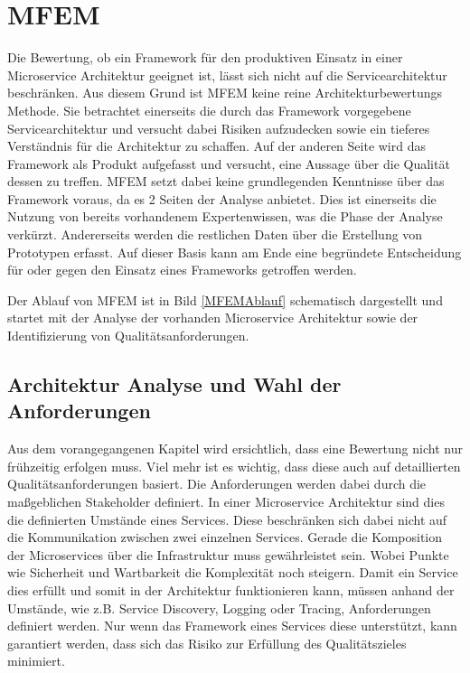 \section{\acf{MFEM}}

Die Bewertung, ob ein Framework für den produktiven Einsatz in einer Microservice Architektur geeignet ist, lässt sich nicht auf die Servicearchitektur beschränken. Aus diesem Grund ist \ac{MFEM} keine reine Architekturbewertungs Methode. Sie betrachtet einerseits die durch das Framework vorgegebene Servicearchitektur und versucht dabei Risiken aufzudecken sowie ein tieferes Verständnis für die Architektur zu schaffen. Auf der anderen Seite wird das Framework als Produkt aufgefasst und versucht, eine Aussage über die Qualität dessen zu treffen. \ac{MFEM} setzt dabei keine grundlegenden Kenntnisse über das Framework voraus, da es 2 Seiten der Analyse anbietet. Dies ist einerseits die Nutzung von bereits vorhandenem Expertenwissen, was die Phase der Analyse verkürzt. Andererseits werden die restlichen Daten über die Erstellung von Prototypen erfasst.
Auf dieser Basis kann am Ende eine begründete Entscheidung für oder gegen den Einsatz eines Frameworks getroffen werden.

Der Ablauf von \ac{MFEM} ist in Bild \ref{MFEMAblauf} schematisch dargestellt und startet mit der Analyse der vorhanden Microservice Architektur sowie der Identifizierung von Qualitätsanforderungen.


\subsection{Architektur Analyse und Wahl der Anforderungen}

Aus dem vorangegangenen Kapitel wird ersichtlich, dass eine Bewertung nicht nur frühzeitig erfolgen muss. Viel mehr ist es wichtig, dass diese auch auf detaillierten Qualitätsanforderungen basiert. Die Anforderungen werden dabei durch die maßgeblichen Stakeholder definiert. In einer Microservice Architektur sind dies die definierten Umstände eines Services. Diese beschränken sich dabei nicht auf die Kommunikation zwischen zwei einzelnen Services. Gerade die Komposition der Microservices über die Infrastruktur muss gewährleistet sein. Wobei Punkte wie Sicherheit und Wartbarkeit die Komplexität noch steigern.
Damit ein Service dies erfüllt und somit in der Architektur funktionieren kann, müssen anhand der Umstände, wie z.B. Service Discovery, Logging oder Tracing, Anforderungen definiert werden. Nur wenn das Framework eines Services diese unterstützt, kann garantiert werden, dass sich das Risiko zur Erfüllung des Qualitätszieles minimiert.

